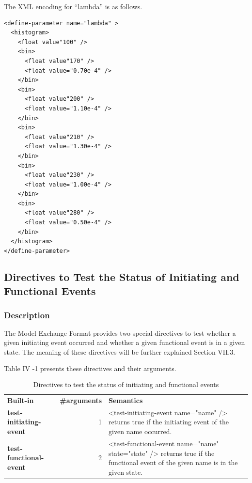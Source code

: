 \documentclass[11pt]{article}
\begin{document}
The XML encoding for ``lambda'' is as follows.
\lstset{language=XML,label= ,caption= ,captionpos=b,numbers=none}
\begin{lstlisting}
<define-parameter name="lambda" >
  <histogram>
    <float value"100" />
    <bin> 
      <float value"170" /> 
      <float value="0.70e-4" /> 
    </bin>
    <bin> 
      <float value"200" /> 
      <float value="1.10e-4" /> 
    </bin>
    <bin> 
      <float value"210" /> 
      <float value="1.30e-4" /> 
    </bin>
    <bin> 
      <float value"230" /> 
      <float value="1.00e-4" /> 
    </bin>
    <bin> 
      <float value"280" /> 
      <float value="0.50e-4" /> 
    </bin>
  </histogram>
</define-parameter>
\end{lstlisting}

\subsection{Directives to Test the Status of Initiating and Functional Events}
\label{sec:orgcde4bc8}



\subsubsection{Description}
\label{sec:orgd838606}

The Model Exchange Format provides two special directives to test
whether a given initiating event occurred and whether a given functional
event is in a given state. The meaning of these directives will be
further explained Section VII.3.

Table IV -1 presents these directives and their arguments.



\begin{table}[htbp]
\caption{Directives to test the status of initiating and functional events \label{TableV-6}}
\centering
\begin{tabular}{lrl}
\textbf{Built-in} & \textbf{\#arguments} & \textbf{Semantics}\\
\textbf{test-initiating-event} & 1 & <test-initiating-event name="name" /> returns true if the initiating event of the given name occurred.\\
\textbf{test-functional-event} & 2 & <test-functional-event name="name" state="state" /> returns true if the functional event of the given name is in the given state.\\
\end{tabular}
\end{table}
\end{document}
